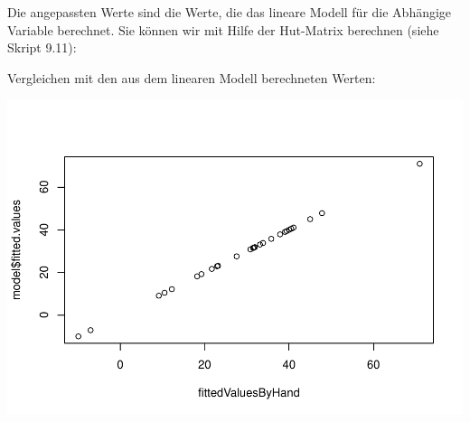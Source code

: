\documentclass[]{article}
\newenvironment{Shaded}{\begin{snugshade}}{\end{snugshade}}
\newcommand{\DataTypeTok}[1]{\textcolor[rgb]{0.13,0.29,0.53}{#1}}
\newcommand{\DecValTok}[1]{\textcolor[rgb]{0.00,0.00,0.81}{#1}}
\newcommand{\KeywordTok}[1]{\textcolor[rgb]{0.13,0.29,0.53}{\textbf{#1}}}
\newcommand{\NormalTok}[1]{#1}
\newcommand{\OperatorTok}[1]{\textcolor[rgb]{0.81,0.36,0.00}{\textbf{#1}}}
\newcommand{\StringTok}[1]{\textcolor[rgb]{0.31,0.60,0.02}{#1}}
\begin{document}
Die angepassten Werte sind die Werte, die das lineare Modell für die Abhängige Variable berechnet.
Sie können wir mit Hilfe der Hut-Matrix berechnen (siehe Skript 9.11):

\begin{Shaded}
\end{Shaded}

Vergleichen mit den aus dem linearen Modell berechneten Werten:

\begin{Shaded}
\end{Shaded}

\includegraphics{Test_files/figure-latex/unnamed-chunk-15-1.pdf}
\end{document}

